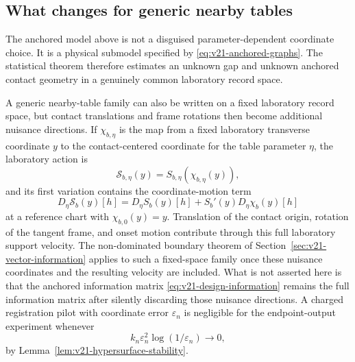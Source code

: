 \subsection{What changes for generic nearby tables}

The anchored model above is not a disguised parameter-dependent coordinate
choice.  It is a physical submodel specified by
\eqref{eq:v21-anchored-graphs}.  The statistical theorem therefore estimates
an unknown gap and unknown anchored contact geometry in a genuinely common
laboratory record space.

A generic nearby-table family can also be written on a fixed laboratory
record space, but contact translations and frame rotations then become
additional nuisance directions.  If $\chi_{b,\eta}$ is the map from a fixed
laboratory transverse coordinate $y$ to the contact-centered coordinate for
the table parameter $\eta$, the laboratory action is
\[
 \mathscr S_{b,\eta}(y)=S_{b,\eta}(\chi_{b,\eta}(y)),
\]
and its first variation contains the coordinate-motion term
\begin{equation}\label{eq:v21-frame-motion-term}
 D_\eta\mathscr S_b(y)[h]
 =D_\eta S_b(y)[h]+S_b'(y)D_\eta\chi_b(y)[h]
\end{equation}
at a reference chart with $\chi_{b,0}(y)=y$.  Translation of the contact
origin, rotation of the tangent frame, and onset motion contribute through
this full laboratory support velocity.  The non-dominated boundary theorem
of Section~\ref{sec:v21-vector-information} applies to such a fixed-space
family once these nuisance coordinates and the resulting velocity are
included.  What is not asserted here is that the anchored information matrix
\eqref{eq:v21-design-information} remains the full information matrix after
silently discarding those nuisance directions.  A charged registration pilot
with coordinate error $\varepsilon_n$ is negligible for the endpoint-output
experiment whenever
\[
 k_n\varepsilon_n^2\log(1/\varepsilon_n)\longrightarrow0,
\]
by Lemma~\ref{lem:v21-hypersurface-stability}.
